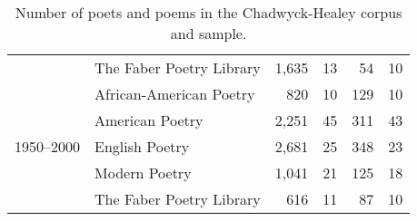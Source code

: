 \begin{table}[t]
{\begin{tabular}{llrrrr}
   & The Faber Poetry Library & 1,635 & 13 & 54 & 10 \\
  \cline{1-6}
  \multirow[t]{5}{*}{1950--2000} & African-American Poetry & 820 & 10 & 129 & 10 \\
   & American Poetry & 2,251 & 45 & 311 & 43 \\
   & English Poetry & 2,681 & 25 & 348 & 23 \\
   & Modern Poetry & 1,041 & 21 & 125 & 18 \\
   & The Faber Poetry Library & 616 & 11 & 87 & 10 \\
  \bottomrule
  \end{tabular}
  }
  \caption{Number of poets and poems in the Chadwyck-Healey corpus and sample.}
  \label{tab:num_poems_corpus}
\end{table}